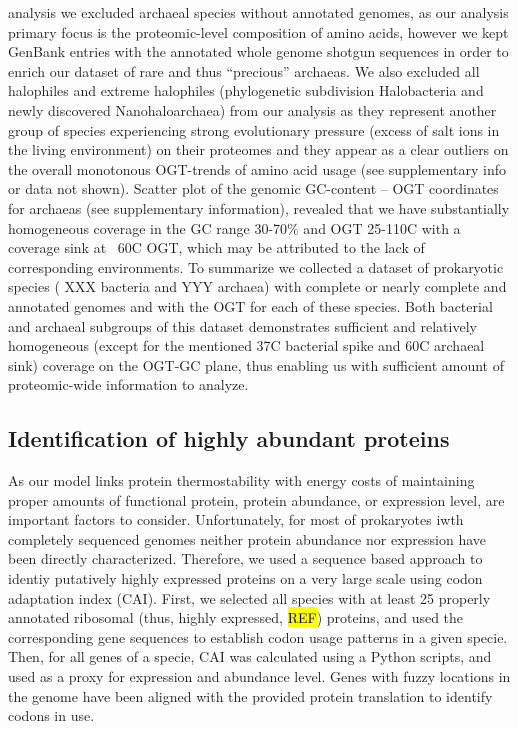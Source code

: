 \documentclass[10pt,letterpaper]{article}
\begin{document}
analysis we excluded archaeal species without annotated genomes, as our analysis primary focus is the proteomic-level composition of amino acids, however we kept GenBank entries with the annotated whole genome shotgun sequences in order to enrich our dataset of  rare and thus ``precious'' archaeas. We also excluded all halophiles and extreme halophiles (phylogenetic subdivision Halobacteria and newly discovered Nanohaloarchaea) from our analysis as they represent another group of species experiencing strong evolutionary pressure (excess of salt ions in the living environment) on their proteomes and they appear as a clear outliers on the overall monotonous OGT-trends of amino acid usage (see supplementary info or data not shown). Scatter plot of the genomic GC-content -- OGT coordinates for archaeas (see supplementary information), revealed that we have substantially homogeneous coverage in the GC range 30-70\% and OGT 25-110C with a coverage sink at ~60C OGT, which may be attributed to the lack of corresponding environments. To summarize we collected a dataset of prokaryotic species ( XXX bacteria and YYY archaea) with complete or nearly complete and annotated genomes and with the OGT for each of these species. Both bacterial and archaeal subgroups of this dataset demonstrates sufficient and relatively homogeneous (except for the mentioned 37C bacterial spike and 60C archaeal sink) coverage on the OGT-GC plane, thus enabling us with sufficient amount of proteomic-wide information to analyze.

\subsection*{Identification of  highly abundant proteins}
As our model links protein thermostability with energy costs of maintaining proper amounts of functional protein, protein abundance, or expression level, are important factors to consider. Unfortunately, for most of prokaryotes iwth completely sequenced genomes neither protein abundance nor expression have been directly characterized. Therefore, we used a sequence based approach to identiy putatively highly expressed proteins on a very large scale using codon adaptation index (CAI).  First, we selected all species with at least 25 properly annotated ribosomal (thus, highly expressed, \hl{REF}) proteins, and used the corresponding gene sequences to establish codon usage patterns in a given specie. Then, for all genes of a specie, CAI was calculated using a Python scripts, and used as a proxy for expression and abundance level. Genes with fuzzy locations in the genome have been aligned with the provided protein translation to identify codons in use.
\end{document}
